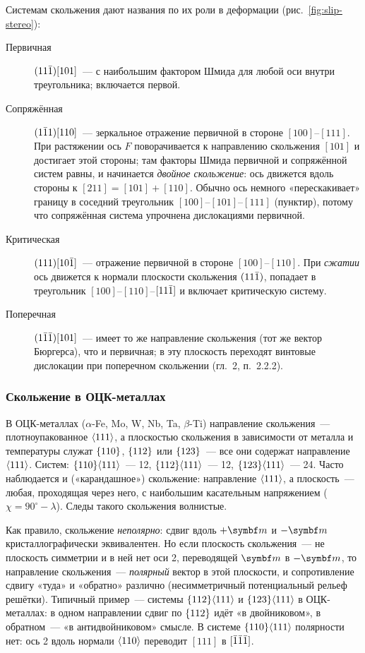 Системам скольжения дают названия по их роли в деформации
(рис.~\ref{fig:slip-stereo}):
\begin{description}
\item[Первичная] $(11\bar{1})[101]$~— с наибольшим фактором Шмида для любой
оси внутри треугольника; включается первой.
\item[Сопряжённая] $(1\bar{1}1)[110]$~— зеркальное отражение первичной в
стороне $[100]$--$[111]$. При растяжении ось $F$ поворачивается к
направлению скольжения $[101]$ и достигает этой стороны; там факторы
Шмида первичной и сопряжённой систем равны, и начинается \emph{двойное
скольжение}: ось движется вдоль стороны к $[211]=[101]+[110]$. Обычно
ось немного «перескакивает» границу в соседний треугольник
$[100]$--$[101]$--$[111]$ (пунктир), потому что сопряжённая система
упрочнена дислокациями первичной.
\item[Критическая] $(111)[10\bar{1}]$~— отражение первичной в стороне
$[100]$--$[110]$. При \emph{сжатии} ось движется к нормали плоскости
скольжения $(11\bar{1})$, попадает в треугольник $[100]$--$[110]$--$[11\bar{1}]$
и включает критическую систему.
\item[Поперечная] $(1\bar{1}\bar{1})[101]$~— имеет то же направление
скольжения (тот же вектор Бюргерса), что и первичная; в эту плоскость
переходят винтовые дислокации при поперечном скольжении (гл.~2,
п.~2.2.2).
\end{description}

\subsubsection{Скольжение в ОЦК-металлах}

В ОЦК-металлах ($\alpha$-Fe, Mo, W, Nb, Ta, $\beta$-Ti) направление
скольжения~— плотноупакованное $\langle 111\rangle$, а плоскостью скольжения в
зависимости от металла и температуры служат $\{110\}$, $\{112\}$
или $\{123\}$~— все они содержат направление $\langle 111\rangle$.
Систем: $\{110\}\langle 111\rangle$~— 12, $\{112\}\langle 111\rangle$~— 12,
$\{123\}\langle 111\rangle$~— 24. Часто наблюдается и
 («карандашное») скольжение: направление
$\langle 111\rangle$, а плоскость~— любая, проходящая через него, с наибольшим
касательным напряжением ($\chi=90^\circ-\lambda$). Следы такого скольжения
волнистые.

Как правило, скольжение \emph{неполярно}: сдвиг вдоль $+\vb m$ и $-\vb m$
кристаллографически эквивалентен. Но если плоскость скольжения~— не
плоскость симметрии и в ней нет оси 2, переводящей $\vb m$ в $-\vb m$,
то направление скольжения~— \emph{полярный} вектор в этой плоскости, и
сопротивление сдвигу «туда» и «обратно» различно (несимметричный
потенциальный рельеф решётки). Типичный пример~— системы
$\{112\}\langle 111\rangle$ и $\{123\}\langle 111\rangle$ в ОЦК-металлах: в
одном направлении сдвиг по $\{112\}$ идёт «в двойниковом», в обратном~—
«в антидвойниковом» смысле. В системе $\{110\}\langle 111\rangle$ полярности
нет: ось 2 вдоль нормали $\langle 110\rangle$ переводит $[111]$ в $[\bar{1}\bar{1}\bar{1}]$.

